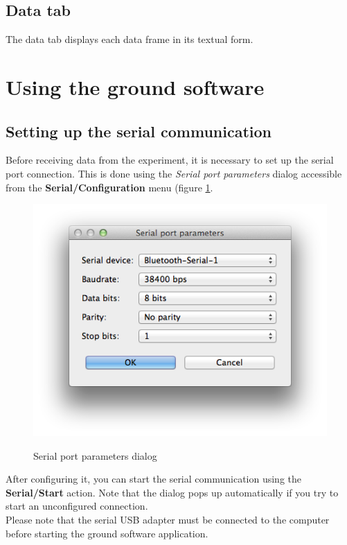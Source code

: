\documentclass[11pt,a4paper,oneside]{report}
\begin{document}
\subsection{Data tab}

The data tab displays each data frame in its textual form.

\section{Using the ground software}

\subsection{Setting up the serial communication}

Before receiving data from the experiment, it is necessary to set up the serial port connection.
This is done using the \emph{Serial port parameters} dialog accessible from the \textbf{Serial/Configuration} menu (figure \ref{image:gs_serial_parameters}.

\begin{figure}[!h]
\center
\includegraphics[scale=0.6]{images/gs_serial_parameters.png}
\label{image:gs_serial_parameters}
\caption{Serial port parameters dialog}
\end{figure}

After configuring it, you can start the serial communication using the \textbf{Serial/Start} action.
Note that the dialog pops up automatically if you try to start an unconfigured connection. \\

Please note that the serial USB adapter must be connected to the computer before starting the ground software application.
\end{document}
